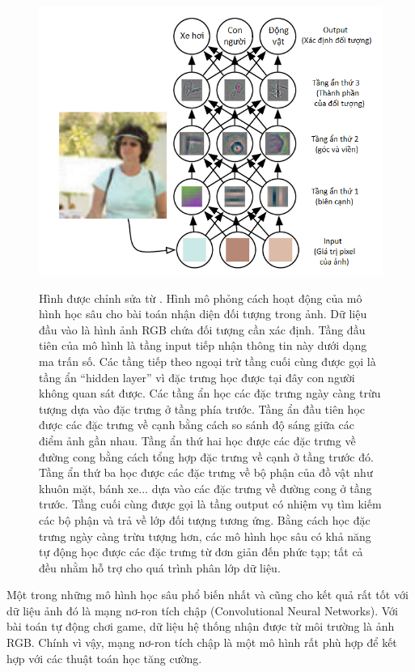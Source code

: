	\begin{figure}
		\centering
		\includegraphics[width=\textwidth]{deep_learning_example}
		\label{fig_dl_Example}
		\caption[Hình mô phỏng cách hoạt động của mô hình học sâu]{Hình được chỉnh sửa từ \cite{Goodfellow-et-al-2016-Book}. 
		Hình mô phỏng cách hoạt động của mô hình học sâu cho bài toán nhận diện đối tượng trong ảnh.
		Dữ liệu đầu vào là hình ảnh RGB chứa đối tượng cần xác định. Tầng đầu tiên của mô hình là tầng input tiếp nhận thông tin này dưới dạng ma trấn số. 
		Các tầng tiếp theo ngoại trừ tầng cuối cùng được gọi là tầng ẩn ``hidden layer'' vì đặc trưng học được tại đây con người không quan sát được. 
		Các tầng ẩn học các đặc trưng ngày càng trừu tượng dựa vào đặc trưng ở tầng phía trước. 
		Tầng ẩn đầu tiên học được các đặc trưng về cạnh bằng cách so sánh độ sáng giữa các điểm ảnh gần nhau. 
		Tầng ẩn thứ hai học được các đặc trưng về đường cong bằng cách tổng hợp đặc trưng về cạnh ở tầng trước đó. 
		Tầng ẩn thứ ba học được các đặc trưng về bộ phận của đồ vật như khuôn mặt, bánh xe... dựa vào các đặc trưng về đường cong ở tầng trước. 
		Tầng cuối cùng được gọi là tầng output có nhiệm vụ tìm kiếm các bộ phận và trả về lớp đối tượng tương ứng. 
		Bằng cách học đặc trưng ngày càng trừu tượng hơn, các mô hình học sâu có khả năng tự động học được các đặc trưng từ đơn giản đến phức tạp; tất cả đều nhằm hỗ trợ cho quá trình phân lớp dữ liệu.}
	\end{figure}
	
	Một trong những mô hình học sâu phổ biến nhất và cũng cho kết quả rất tốt với dữ liệu ảnh \cite{lecun2015deep} đó là mạng nơ-ron tích chập (Convolutional Neural Networks).
	Với bài toán tự động chơi game, dữ liệu hệ thống nhận được từ môi trường là ảnh RGB.
	Chính vì vậy, mạng nơ-ron tích chập là một mô hình rất phù hợp để kết hợp với các thuật toán học tăng cường.
	
